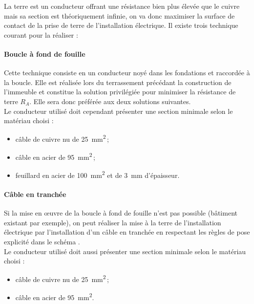 La terre est un conducteur offrant une résistance bien plus élevée que le cuivre mais sa \og section \fg{} est théoriquement infinie, on va donc maximiser la surface de contact de la prise de terre de l'installation électrique. Il existe trois technique courant pour la réaliser :

\paragraph{Boucle à fond de fouille}
Cette technique consiste en un conducteur noyé dans les fondations et raccordée à la boucle. Elle est réalisée lors du terrassement précédant la construction de l'immeuble et constitue la solution privilégiée pour minimiser la résistance de terre $R_A$. Elle sera donc préférée aux deux solutions suivantes.\\
Le conducteur utilisé doit cependant présenter une section minimale selon le matériau choisi :
\begin{itemize}
\item câble de cuivre nu de \SI{25}{\square\milli\meter}\,;
\item câble en acier de \SI{95}{\square\milli\meter}\,;
\item feuillard en acier de \SI{100}{\square\milli\meter} et de \SI{3}{\milli\meter} d'épaisseur.
\end{itemize}


\paragraph{Câble en tranchée}
Si la mise en \oe{}uvre de la boucle à fond de fouille n'est pas possible (bâtiment existant par exemple), on peut réaliser la mise à la terre de l'installation électrique par l'installation d'un câble en tranchée en respectant les règles de pose explicité dans le schéma .\\
Le conducteur utilisé doit aussi présenter une section minimale selon le matériau choisi :
\begin{itemize}
\item câble de cuivre nu de \SI{25}{\square\milli\meter}\,;
\item câble en acier de \SI{95}{\square\milli\meter}.
\end{itemize}



